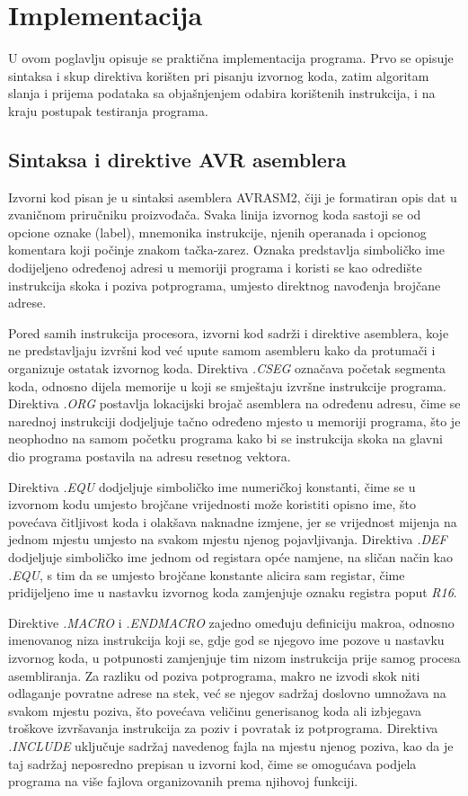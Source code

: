 %
%
\chapter{Implementacija}
\label{chap:implementation}
%
U ovom poglavlju opisuje se praktična implementacija programa. Prvo se
opisuje sintaksa i skup direktiva korišten pri pisanju izvornog koda,
zatim algoritam slanja i prijema podataka sa objašnjenjem odabira
korištenih instrukcija, i na kraju postupak testiranja programa.
%
\section{Sintaksa i direktive AVR asemblera}
\label{sec:syntax}
%
Izvorni kod pisan je u sintaksi asemblera \foreignlanguage{english}{AVRASM2}, čiji je
formatiran opis dat u zvaničnom priručniku proizvođača. Svaka linija
izvornog koda sastoji se od opcione oznake (\foreignlanguage{english}{label}), mnemonika
instrukcije, njenih operanada i opcionog komentara koji počinje znakom
tačka-zarez. Oznaka predstavlja simboličko ime dodijeljeno određenoj
adresi u memoriji programa i koristi se kao odredište instrukcija skoka
i poziva potprograma, umjesto direktnog navođenja brojčane adrese.

Pored samih instrukcija procesora, izvorni kod sadrži i direktive
asemblera, koje ne predstavljaju izvršni kod već upute samom asembleru
kako da protumači i organizuje ostatak izvornog koda. Direktiva
\emph{.CSEG} označava početak segmenta koda, odnosno dijela memorije u koji se
smještaju izvršne instrukcije programa. Direktiva \emph{.ORG} postavlja
lokacijski brojač asemblera na određenu adresu, čime se narednoj
instrukciji dodjeljuje tačno određeno mjesto u memoriji programa, što je
neophodno na samom početku programa kako bi se instrukcija skoka na
glavni dio programa postavila na adresu resetnog vektora.

Direktiva \emph{.EQU} dodjeljuje simboličko ime numeričkoj konstanti, čime se
u izvornom kodu umjesto brojčane vrijednosti može koristiti opisno ime,
što povećava čitljivost koda i olakšava naknadne izmjene, jer se
vrijednost mijenja na jednom mjestu umjesto na svakom mjestu njenog
pojavljivanja. Direktiva \emph{.DEF} dodjeljuje simboličko ime jednom od
registara opće namjene, na sličan način kao \emph{.EQU}, s tim da se
umjesto brojčane konstante alicira sam registar, čime pridijeljeno ime
u nastavku izvornog koda zamjenjuje oznaku registra poput \emph{R16}.

Direktive \emph{.MACRO} i \emph{.ENDMACRO} zajedno omeđuju definiciju makroa, odnosno
imenovanog niza instrukcija koji se, gdje god se njegovo ime pozove u
nastavku izvornog koda, u potpunosti zamjenjuje tim nizom instrukcija
prije samog procesa asembliranja. Za razliku od poziva potprograma,
makro ne izvodi skok niti odlaganje povratne adrese na stek, već se
njegov sadržaj doslovno umnožava na svakom mjestu poziva, što povećava
veličinu generisanog koda ali izbjegava troškove izvršavanja instrukcija
za poziv i povratak iz potprograma. Direktiva \emph{.INCLUDE} uključuje
sadržaj navedenog fajla na mjestu njenog poziva, kao da je taj sadržaj
neposredno prepisan u izvorni kod, čime se omogućava podjela programa
na više fajlova organizovanih prema njihovoj funkciji.

